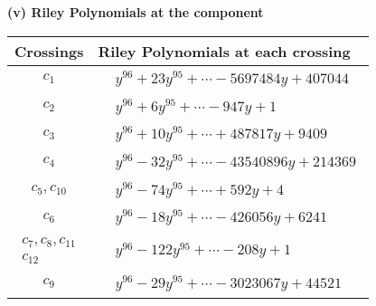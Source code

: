 \documentclass[1p]{elsarticle_modified}
\theoremstyle{definition}
\begin{document}
\newpage\renewcommand{\arraystretch}{1}
\flushleft \textbf{(v) Riley Polynomials at the component}\newline \\
\begin{tabular}{m{50pt}|m{274pt}}
Crossings & \hspace{64pt}Riley Polynomials at each crossing \\
\hline $$\begin{aligned}c_{1}\end{aligned}$$&$\begin{aligned}
&y^{96}+23 y^{95}+\cdots-5697484 y+407044
\end{aligned}$\\
\hline $$\begin{aligned}c_{2}\end{aligned}$$&$\begin{aligned}
&y^{96}+6 y^{95}+\cdots-947 y+1
\end{aligned}$\\
\hline $$\begin{aligned}c_{3}\end{aligned}$$&$\begin{aligned}
&y^{96}+10 y^{95}+\cdots+487817 y+9409
\end{aligned}$\\
\hline $$\begin{aligned}c_{4}\end{aligned}$$&$\begin{aligned}
&y^{96}-32 y^{95}+\cdots-43540896 y+214369
\end{aligned}$\\
\hline $$\begin{aligned}c_{5},c_{10}\end{aligned}$$&$\begin{aligned}
&y^{96}-74 y^{95}+\cdots+592 y+4
\end{aligned}$\\
\hline $$\begin{aligned}c_{6}\end{aligned}$$&$\begin{aligned}
&y^{96}-18 y^{95}+\cdots-426056 y+6241
\end{aligned}$\\
\hline $$\begin{aligned}c_{7},c_{8},c_{11}\\c_{12}\end{aligned}$$&$\begin{aligned}
&y^{96}-122 y^{95}+\cdots-208 y+1
\end{aligned}$\\
\hline $$\begin{aligned}c_{9}\end{aligned}$$&$\begin{aligned}
&y^{96}-29 y^{95}+\cdots-3023067 y+44521
\end{aligned}$\\
\hline
\end{tabular}\\~\\
\end{document}
